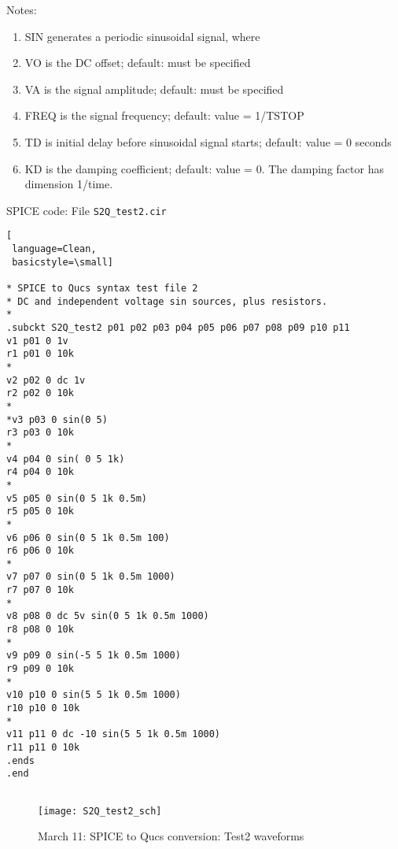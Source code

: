 Notes:
\begin{enumerate}
 \item SIN generates a periodic sinusoidal signal, where
 \item VO is the DC offset; default: must be specified
 \item VA is the signal amplitude; default: must be specified
 \item FREQ is the signal frequency; default: value = 1/TSTOP
 \item TD is initial delay before sinusoidal signal starts; default: value = 0 seconds
 \item KD is the damping coefficient; default: value = 0. The damping factor has dimension 1/time.

\end{enumerate}





SPICE code: File \verb|S2Q_test2.cir|

\begin{lstlisting}[
 language=Clean, 
 basicstyle=\small]

* SPICE to Qucs syntax test file 2
* DC and independent voltage sin sources, plus resistors.
*
.subckt S2Q_test2 p01 p02 p03 p04 p05 p06 p07 p08 p09 p10 p11
v1 p01 0 1v
r1 p01 0 10k
*
v2 p02 0 dc 1v
r2 p02 0 10k
*
*v3 p03 0 sin(0 5)
r3 p03 0 10k
*
v4 p04 0 sin( 0 5 1k)
r4 p04 0 10k
*
v5 p05 0 sin(0 5 1k 0.5m)
r5 p05 0 10k
*
v6 p06 0 sin(0 5 1k 0.5m 100)
r6 p06 0 10k
*
v7 p07 0 sin(0 5 1k 0.5m 1000)
r7 p07 0 10k
*
v8 p08 0 dc 5v sin(0 5 1k 0.5m 1000)
r8 p08 0 10k
*
v9 p09 0 sin(-5 5 1k 0.5m 1000)
r9 p09 0 10k
*
v10 p10 0 sin(5 5 1k 0.5m 1000)
r10 p10 0 10k
*
v11 p11 0 dc -10 sin(5 5 1k 0.5m 1000)
r11 p11 0 10k
.ends
.end


\end{lstlisting}


\begin{figure}
  \centering
  \texttt{[image: S2Q\_test2\_sch]}
  \caption{March 11: SPICE to Qucs conversion: Test2 waveforms}
  \label{fig:S2Qtest2_1}
\end{figure} 

